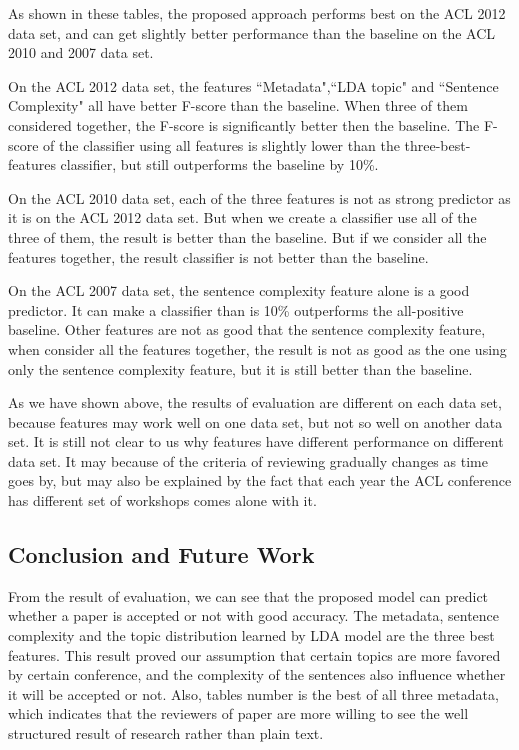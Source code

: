 \documentclass[11pt,letterpaper]{article}
\begin{document}
As shown in these tables,
the proposed approach performs best on the ACL 2012 data set,
and can get slightly better performance than the baseline on the ACL 2010 and 2007 data set.

On the ACL 2012 data set, the features ``Metadata",``LDA topic" and ``Sentence Complexity" 
all have better F-score than the baseline.
When three of them considered together, the F-score is significantly better then the baseline.
The F-score of the classifier using all features is slightly lower than the three-best-features classifier,
but still outperforms the baseline by 10\%.

On the ACL 2010 data set, each of the three features is not as strong predictor as it is on the ACL 2012 data set.
But when we create a classifier use all of the three of them, 
the result is better than the baseline. 
But if we consider all the features together, 
the result classifier is not better than the baseline.

On the ACL 2007 data set, the sentence complexity feature alone is a good predictor.
It can make a classifier than is 10\% outperforms the all-positive baseline.
Other features are not as good that the sentence complexity feature,
when consider all the features together, the result is not as good as the one using only the sentence complexity feature,
but it is still better than the baseline.

As we have shown above, the results of evaluation are different on each data set, because features may work well on one data set, 
but not so well on another data set.
It is still not clear to us why features have different performance on different data set.
It may because of the criteria of reviewing gradually changes as time goes by, 
but may also be explained by the fact that each year the ACL conference has different set of workshops comes alone with it.


\subsection{Conclusion and Future Work} 
From the result of evaluation, we can see that the proposed model can predict whether a paper is accepted or not with good accuracy. 
The metadata, sentence complexity and the topic distribution learned by LDA model are the three best features.
This result proved our assumption that certain topics are more favored by certain conference,
and the complexity of the sentences also influence whether it will be accepted or not.
Also, tables number is the best of all three metadata, which indicates that the reviewers of paper are more willing to see the well structured result of research rather than plain text.
\end{document}
